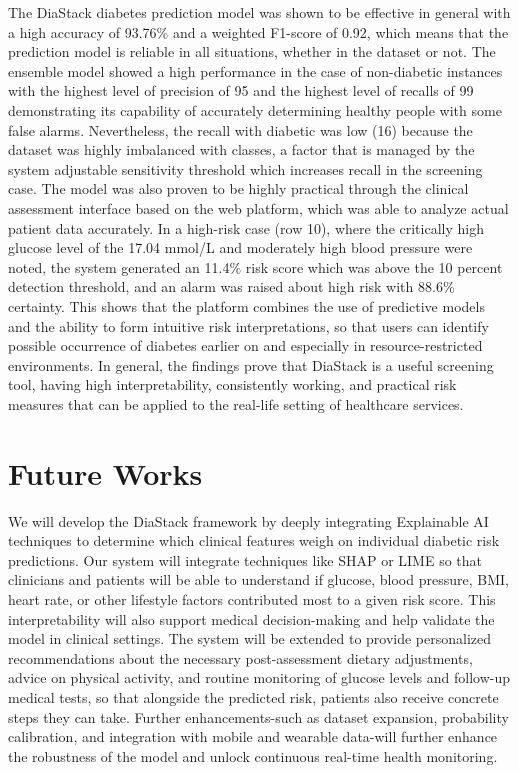 \documentclass[conference, letterpaper]{IEEEtran}
\begin{document}
The DiaStack diabetes prediction model was shown to be effective in general with a high accuracy of 93.76\% and a weighted F1-score of 0.92, which means that the prediction model is reliable in all situations, whether in the dataset or not. The ensemble model showed a high performance in the case of non-diabetic instances with the highest level of precision of 95 and the highest level of recalls of 99 demonstrating its capability of accurately determining healthy people with some false alarms. Nevertheless, the recall with diabetic was low (16) because the dataset was highly imbalanced with classes, a factor that is managed by the system adjustable sensitivity threshold which increases recall in the screening case. The model was also proven to be highly practical through the clinical assessment interface based on the web platform, which was able to analyze actual patient data accurately. In a high-risk case (row 10), where the critically high glucose level of the 17.04 mmol/L and moderately high blood pressure were noted, the system generated an 11.4\% risk score which was above the 10 percent detection threshold, and an alarm was raised about high risk with 88.6\% certainty. This shows that the platform combines the use of predictive models and the ability to form intuitive risk interpretations, so that users can identify possible occurrence of diabetes earlier on and especially in resource-restricted environments. In general, the findings prove that DiaStack is a useful screening tool, having high interpretability, consistently working, and practical risk measures that can be applied to the real-life setting of healthcare services.
\section{Future Works}
\label{future}
We will develop the DiaStack framework by deeply integrating Explainable AI techniques to determine which clinical features weigh on individual diabetic risk predictions. Our system will integrate techniques like SHAP or LIME so that clinicians and patients will be able to understand if glucose, blood pressure, BMI, heart rate, or other lifestyle factors contributed most to a given risk score. This interpretability will also support medical decision-making and help validate the model in clinical settings. The system will be extended to provide personalized recommendations about the necessary post-assessment dietary adjustments, advice on physical activity, and routine monitoring of glucose levels and follow-up medical tests, so that alongside the predicted risk, patients also receive concrete steps they can take. Further enhancements-such as dataset expansion, probability calibration, and integration with mobile and wearable data-will further enhance the robustness of the model and unlock continuous real-time health monitoring.
\end{document}

